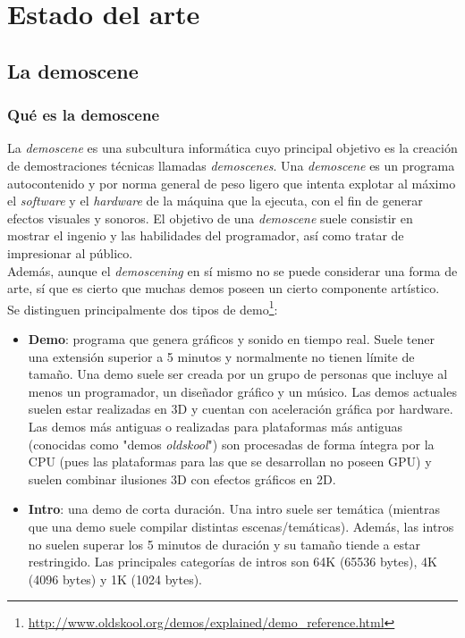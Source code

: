 
\chapter{Estado del arte}

\section{La demoscene}

\subsection{Qué es la demoscene}

La \emph{demoscene} es una subcultura informática cuyo principal objetivo es la creación de demostraciones técnicas llamadas \emph{demoscenes}. Una \emph{demoscene} es un programa autocontenido y por norma general de peso ligero que intenta explotar al máximo el \emph{software} y el \emph{hardware} de la máquina que la ejecuta, con el fin de generar efectos visuales y sonoros. El objetivo de una \emph{demoscene} suele consistir en mostrar el ingenio y las habilidades del programador, así como tratar de impresionar al público.\\

Además, aunque el \emph{demoscening} en sí mismo no se puede considerar una forma de arte, sí que es cierto que muchas demos poseen un cierto componente artístico.\\ 

Se distinguen principalmente dos tipos de demo\footnote{\url{http://www.oldskool.org/demos/explained/demo_reference.html}}:

\begin{itemize}
  \item \textbf{Demo}: programa que genera gráficos y sonido en tiempo real. Suele tener una extensión superior a 5 minutos y normalmente no tienen límite de tamaño. Una demo suele ser creada por un grupo de personas que incluye al menos un programador, un diseñador gráfico y un músico. Las demos actuales suelen estar realizadas en 3D y cuentan con aceleración gráfica por hardware. Las demos más antiguas o realizadas para plataformas más antiguas (conocidas como "demos \emph{oldskool}") son procesadas de forma íntegra por la CPU (pues las plataformas para las que se desarrollan no poseen GPU) y suelen combinar ilusiones 3D con efectos gráficos en 2D.
  \item \textbf{Intro}: una demo de corta duración. Una intro suele ser temática (mientras que una demo suele compilar distintas escenas/temáticas). Además, las intros no suelen superar los 5 minutos de duración y su tamaño tiende a estar restringido. Las principales categorías de intros son 64K (65536 bytes), 4K (4096 bytes) y 1K (1024 bytes).
\end{itemize}


